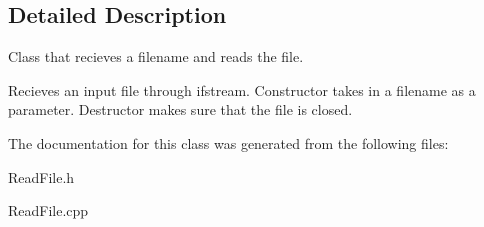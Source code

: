 \subsection{Detailed Description}
Class that recieves a filename and reads the file. 

Recieves an input file through ifstream. Constructor takes in a filename as a parameter. Destructor makes sure that the file is closed. 

The documentation for this class was generated from the following files\+:\begin{DoxyCompactItemize}
\item 
Read\+File.\+h\item 
Read\+File.\+cpp\end{DoxyCompactItemize}
